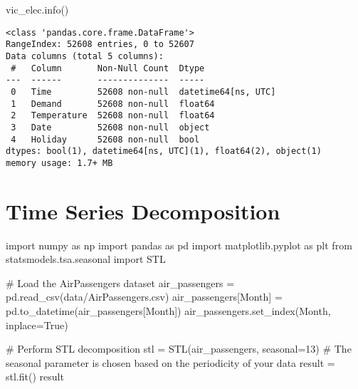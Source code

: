 \documentclass[
  letterpaper,
  DIV=11,
  numbers=noendperiod]{scrreprt}
\newenvironment{Shaded}{\begin{snugshade}}{\end{snugshade}}
\newcommand{\CommentTok}[1]{\textcolor[rgb]{0.37,0.37,0.37}{#1}}
\newcommand{\DecValTok}[1]{\textcolor[rgb]{0.68,0.00,0.00}{#1}}
\newcommand{\ImportTok}[1]{\textcolor[rgb]{0.00,0.46,0.62}{#1}}
\newcommand{\NormalTok}[1]{\textcolor[rgb]{0.00,0.23,0.31}{#1}}
\newcommand{\OperatorTok}[1]{\textcolor[rgb]{0.37,0.37,0.37}{#1}}
\newcommand{\StringTok}[1]{\textcolor[rgb]{0.13,0.47,0.30}{#1}}
\newcommand{\VariableTok}[1]{\textcolor[rgb]{0.07,0.07,0.07}{#1}}
\begin{document}
\begin{Shaded}
\begin{Highlighting}[]
\NormalTok{vic\_elec.info()}
\end{Highlighting}
\end{Shaded}

\begin{verbatim}
<class 'pandas.core.frame.DataFrame'>
RangeIndex: 52608 entries, 0 to 52607
Data columns (total 5 columns):
 #   Column       Non-Null Count  Dtype              
---  ------       --------------  -----              
 0   Time         52608 non-null  datetime64[ns, UTC]
 1   Demand       52608 non-null  float64            
 2   Temperature  52608 non-null  float64            
 3   Date         52608 non-null  object             
 4   Holiday      52608 non-null  bool               
dtypes: bool(1), datetime64[ns, UTC](1), float64(2), object(1)
memory usage: 1.7+ MB
\end{verbatim}


\hypertarget{time-series-decomposition}{%
\chapter{Time Series Decomposition}\label{time-series-decomposition}}

\begin{Shaded}
\begin{Highlighting}[]
\ImportTok{import}\NormalTok{ numpy }\ImportTok{as}\NormalTok{ np}
\ImportTok{import}\NormalTok{ pandas }\ImportTok{as}\NormalTok{ pd}
\ImportTok{import}\NormalTok{ matplotlib.pyplot }\ImportTok{as}\NormalTok{ plt}
\ImportTok{from}\NormalTok{ statsmodels.tsa.seasonal }\ImportTok{import}\NormalTok{ STL}

\CommentTok{\# Load the AirPassengers dataset}
\NormalTok{air\_passengers }\OperatorTok{=}\NormalTok{ pd.read\_csv(}\StringTok{\textquotesingle{}data/AirPassengers.csv\textquotesingle{}}\NormalTok{)}
\NormalTok{air\_passengers[}\StringTok{\textquotesingle{}Month\textquotesingle{}}\NormalTok{] }\OperatorTok{=}\NormalTok{ pd.to\_datetime(air\_passengers[}\StringTok{\textquotesingle{}Month\textquotesingle{}}\NormalTok{])}
\NormalTok{air\_passengers.set\_index(}\StringTok{\textquotesingle{}Month\textquotesingle{}}\NormalTok{, inplace}\OperatorTok{=}\VariableTok{True}\NormalTok{)}

\CommentTok{\# Perform STL decomposition}
\NormalTok{stl }\OperatorTok{=}\NormalTok{ STL(air\_passengers, seasonal}\OperatorTok{=}\DecValTok{13}\NormalTok{)  }\CommentTok{\# The seasonal parameter is chosen based on the periodicity of your data}
\NormalTok{result }\OperatorTok{=}\NormalTok{ stl.fit()}
\NormalTok{result}
\end{Highlighting}
\end{Shaded}
\end{document}
